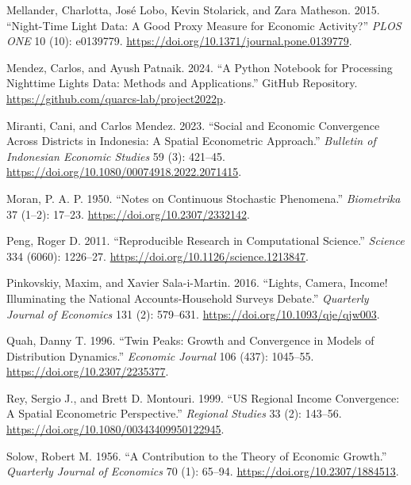 \documentclass[
  letterpaper,
  DIV=11,
  numbers=noendperiod]{scrartcl}
\newlength{\cslhangindent}
\newenvironment{CSLReferences}[2] %
 {\begin{list}{}{%
  \setlength{\itemindent}{0pt}
  \setlength{\leftmargin}{0pt}
  \setlength{\parsep}{0pt}
  \ifodd #1
   \setlength{\leftmargin}{\cslhangindent}
   \setlength{\itemindent}{-1\cslhangindent}
  \fi
  \setlength{\itemsep}{#2\baselineskip}}}
 {\end{list}}
\begin{document}
\begin{CSLReferences}{1}{0}
Mellander, Charlotta, José Lobo, Kevin Stolarick, and Zara Matheson.
2015. {``Night-Time Light Data: A Good Proxy Measure for Economic
Activity?''} \emph{PLOS ONE} 10 (10): e0139779.
\url{https://doi.org/10.1371/journal.pone.0139779}.

Mendez, Carlos, and Ayush Patnaik. 2024. {``A Python Notebook for
Processing Nighttime Lights Data: Methods and Applications.''} GitHub
Repository. \url{https://github.com/quarcs-lab/project2022p}.

Miranti, Cani, and Carlos Mendez. 2023. {``Social and Economic
Convergence Across Districts in {Indonesia}: {A} Spatial Econometric
Approach.''} \emph{Bulletin of Indonesian Economic Studies} 59 (3):
421--45. \url{https://doi.org/10.1080/00074918.2022.2071415}.

Moran, P. A. P. 1950. {``Notes on Continuous Stochastic Phenomena.''}
\emph{Biometrika} 37 (1--2): 17--23.
\url{https://doi.org/10.2307/2332142}.

Peng, Roger D. 2011. {``Reproducible Research in Computational
Science.''} \emph{Science} 334 (6060): 1226--27.
\url{https://doi.org/10.1126/science.1213847}.

Pinkovskiy, Maxim, and Xavier Sala-i-Martin. 2016. {``Lights, Camera,
Income! Illuminating the National Accounts-Household Surveys Debate.''}
\emph{Quarterly Journal of Economics} 131 (2): 579--631.
\url{https://doi.org/10.1093/qje/qjw003}.

Quah, Danny T. 1996. {``Twin Peaks: Growth and Convergence in Models of
Distribution Dynamics.''} \emph{Economic Journal} 106 (437): 1045--55.
\url{https://doi.org/10.2307/2235377}.

Rey, Sergio J., and Brett D. Montouri. 1999. {``US Regional Income
Convergence: A Spatial Econometric Perspective.''} \emph{Regional
Studies} 33 (2): 143--56.
\url{https://doi.org/10.1080/00343409950122945}.

Solow, Robert M. 1956. {``A Contribution to the Theory of Economic
Growth.''} \emph{Quarterly Journal of Economics} 70 (1): 65--94.
\url{https://doi.org/10.2307/1884513}.


\end{CSLReferences}
\end{document}
